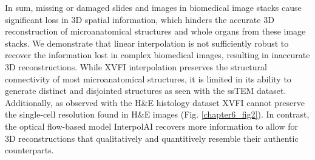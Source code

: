 \begin{refsection}
    In sum, missing or damaged slides and images in biomedical image stacks cause significant loss in 3D spatial information, which hinders the accurate 3D reconstruction of microanatomical structures and whole organs from these image stacks. We demonstrate that linear interpolation is not sufficiently robust to recover the information lost in complex biomedical images, resulting in inaccurate 3D reconstructions. While XVFI interpolation preserves the structural connectivity of most microanatomical structures, it is limited in its ability to generate distinct and disjointed structures as seen with the ssTEM dataset. Additionally, as observed with the H\&E histology dataset XVFI cannot preserve the single-cell resolution found in H\&E images (Fig. \ref{chapter6_fig2}). In contrast, the optical flow-based model InterpolAI recovers more information to allow for 3D reconstructions that qualitatively and quantitively resemble their authentic counterparts.


\end{refsection}
